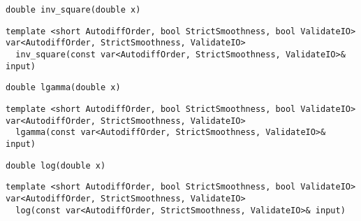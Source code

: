 \begin{tcolorbox}[colback=white,colframe=gray90, coltitle=black,boxrule=3pt,
fonttitle=\bfseries,title= Inv Square]

\begin{verbatim}
double inv_square(double x)

\end{verbatim}

\begin{verbatim}
template <short AutodiffOrder, bool StrictSmoothness, bool ValidateIO>
var<AutodiffOrder, StrictSmoothness, ValidateIO>
  inv_square(const var<AutodiffOrder, StrictSmoothness, ValidateIO>& input)

\end{verbatim}

\end{tcolorbox}

\begin{tcolorbox}[colback=white,colframe=gray90, coltitle=black,boxrule=3pt,
fonttitle=\bfseries,title= Lgamma]

\begin{verbatim}
double lgamma(double x)

\end{verbatim}

\begin{verbatim}
template <short AutodiffOrder, bool StrictSmoothness, bool ValidateIO>
var<AutodiffOrder, StrictSmoothness, ValidateIO>
  lgamma(const var<AutodiffOrder, StrictSmoothness, ValidateIO>& input)

\end{verbatim}

\end{tcolorbox}

\begin{tcolorbox}[colback=white,colframe=gray90, coltitle=black,boxrule=3pt,
fonttitle=\bfseries,title= Log]

\begin{verbatim}
double log(double x)

\end{verbatim}

\begin{verbatim}
template <short AutodiffOrder, bool StrictSmoothness, bool ValidateIO>
var<AutodiffOrder, StrictSmoothness, ValidateIO>
  log(const var<AutodiffOrder, StrictSmoothness, ValidateIO>& input)

\end{verbatim}

\end{tcolorbox}

